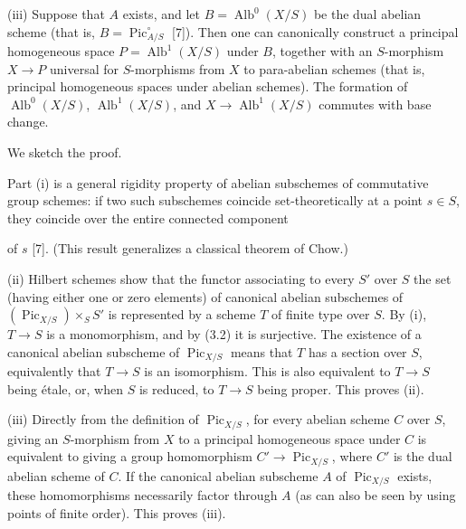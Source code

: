 \noindent(iii) Suppose that $A$ exists, and let
$B=\operatorname{Alb}^0(X/S)$ be the dual abelian scheme (that is,
$B=\operatorname{Pic}_{A/S}^\circ$ [7]). Then one can canonically construct a
principal homogeneous space $P=\operatorname{Alb}^1(X/S)$ under $B$, together
with an $S$-morphism $X\longrightarrow P$ universal for $S$-morphisms from $X$
to para-abelian schemes (that is, principal homogeneous spaces under abelian
schemes). The formation of $\operatorname{Alb}^0(X/S)$,
$\operatorname{Alb}^1(X/S)$, and $X\longrightarrow\operatorname{Alb}^1(X/S)$
commutes with base change.

We sketch the proof.

Part (i) is a general rigidity property of abelian subschemes of commutative
group schemes: if two such subschemes coincide set-theoretically at a point
$s\in S$, they coincide over the entire connected component

of $s$ [7]. (This result generalizes a classical theorem of Chow.)

(ii) Hilbert schemes show that the functor associating to every $S'$ over $S$
the set (having either one or zero elements) of canonical abelian subschemes of
$(\operatorname{Pic}_{X/S})\times_S S'$ is represented by a scheme $T$ of
finite type over $S$. By (i), $T\longrightarrow S$ is a monomorphism, and by
(3.2) it is surjective. The existence of a canonical abelian subscheme of
$\operatorname{Pic}_{X/S}$ means that $T$ has a section over $S$, equivalently
that $T\longrightarrow S$ is an isomorphism. This is also equivalent to
$T\longrightarrow S$ being étale, or, when $S$ is reduced, to
$T\longrightarrow S$ being proper. This proves (ii).

(iii) Directly from the definition of $\operatorname{Pic}_{X/S}$, for every
abelian scheme $C$ over $S$, giving an $S$-morphism from $X$ to a principal
homogeneous space under $C$ is equivalent to giving a group homomorphism
$C'\longrightarrow\operatorname{Pic}_{X/S}$, where $C'$ is the dual abelian
scheme of $C$. If the canonical abelian subscheme $A$ of
$\operatorname{Pic}_{X/S}$ exists, these homomorphisms necessarily factor
through $A$ (as can also be seen by using points of finite order). This proves
(iii).

